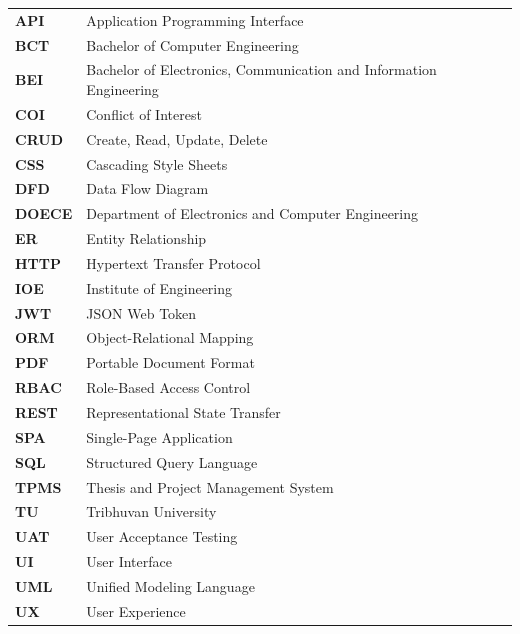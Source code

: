 \documentclass[12pt,a4paper]{report}
\begin{document}
\begin{tabular}{@{}l l@{}}
\textbf{API}   & Application Programming Interface \\
\textbf{BCT}   & Bachelor of Computer Engineering \\
\textbf{BEI}   & Bachelor of Electronics, Communication and Information Engineering \\
\textbf{COI}   & Conflict of Interest \\
\textbf{CRUD}  & Create, Read, Update, Delete \\
\textbf{CSS}   & Cascading Style Sheets \\
\textbf{DFD}   & Data Flow Diagram \\
\textbf{DOECE} & Department of Electronics and Computer Engineering \\
\textbf{ER}    & Entity Relationship \\
\textbf{HTTP}  & Hypertext Transfer Protocol \\
\textbf{IOE}   & Institute of Engineering \\
\textbf{JWT}   & JSON Web Token \\
\textbf{ORM}   & Object-Relational Mapping \\
\textbf{PDF}   & Portable Document Format \\
\textbf{RBAC}  & Role-Based Access Control \\
\textbf{REST}  & Representational State Transfer \\
\textbf{SPA}   & Single-Page Application \\
\textbf{SQL}   & Structured Query Language \\
\textbf{TPMS}  & Thesis and Project Management System \\
\textbf{TU}    & Tribhuvan University \\
\textbf{UAT}   & User Acceptance Testing \\
\textbf{UI}    & User Interface \\
\textbf{UML}   & Unified Modeling Language \\
\textbf{UX}    & User Experience \\
\end{tabular}

\pagestyle{mainpages}
\setcounter{page}{1}







\end{document}
